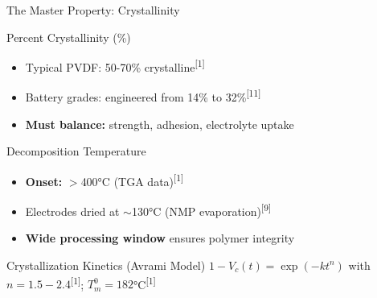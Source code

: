\documentclass[aspectratio=169]{beamer}
\begin{document}
\begin{frame}{The Master Property: Crystallinity}
    \begin{block}{Percent Crystallinity (\%)}
        \begin{itemize}
            \item Typical PVDF: 50-70\% crystalline\textsuperscript{[1]}
            \item Battery grades: engineered from 14\% to 32\%\textsuperscript{[11]}
            \item \textbf{Must balance:} strength, adhesion, electrolyte uptake
        \end{itemize}
    \end{block}
    
    \begin{alertblock}{Decomposition Temperature}
        \begin{itemize}
            \item \textbf{Onset:} $>$400\si{\celsius} (TGA data)\textsuperscript{[1]}
            \item Electrodes dried at $\sim$130\si{\celsius} (NMP evaporation)\textsuperscript{[9]}
            \item \textbf{Wide processing window} ensures polymer integrity
        \end{itemize}
    \end{alertblock}
    
    \begin{exampleblock}{Crystallization Kinetics (Avrami Model)}
        \footnotesize $1 - V_c(t) = \exp(-kt^n)$ with $n = 1.5-2.4$\textsuperscript{[1]}; $T_m^0 = 182$\si{\celsius}\textsuperscript{[1]}
    \end{exampleblock}
\end{frame}
\end{document}
